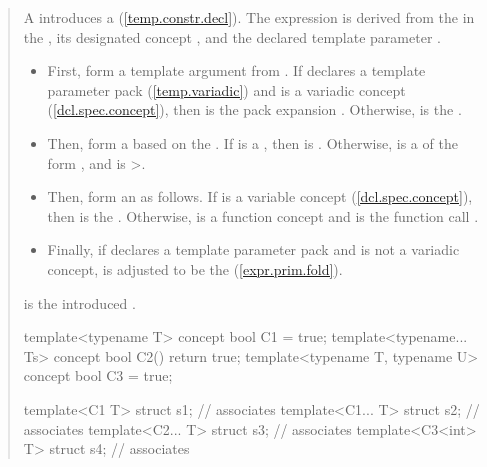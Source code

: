 \begin{quote}
\begin{addedblock}
\pnum
A  introduces a 
 (\ref{temp.constr.decl}).
% 
The expression is derived from the  
 in the , its designated concept 
, and the declared template parameter .
% 
\begin{itemize}
\item First, form a template argument  from . If  
declares a template parameter pack (\ref{temp.variadic})
and  is a variadic concept (\ref{dcl.spec.concept}), then  is 
the pack expansion . Otherwise,  is the 
 .

\item Then, form a   based on the 
 . If  is 
a , then  is . Otherwise, 
 is a  of the form
, and  is >.

\item Then, form an   as follows. 
If  is a variable concept (\ref{dcl.spec.concept}), then  is the 
 . Otherwise,  is a function 
concept and  is the function call .

\item Finally, if  declares a template parameter pack and 
 is not a variadic concept,  is adjusted to be the
  (\ref{expr.prim.fold}).
\end{itemize}
% 
 is the introduced .
% 
\enterexample
\begin{codeblock}
template<typename T> concept bool C1 = true;
template<typename... Ts> concept bool C2() { return true; }
template<typename T, typename U> concept bool C3 = true;

template<C1 T> struct s1;      // associates 
template<C1... T> struct s2;   // associates 
template<C2... T> struct s3;   // associates 
template<C3<int> T> struct s4; // associates 
\end{codeblock}
\exitexample
\end{addedblock}
\end{quote}

